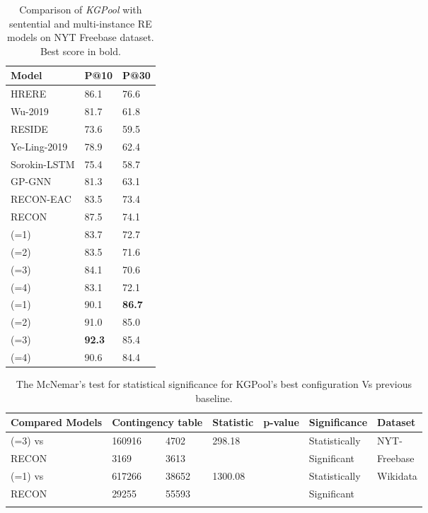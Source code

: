\documentclass[11pt,a4paper]{article}
\newlength\Origarrayrulewidth
\newcommand{\Cline}[1]{\noalign{\global\setlength\Origarrayrulewidth{\arrayrulewidth}}\noalign{\global\setlength\arrayrulewidth{1.1pt}}\cline{#1}\noalign{\global\setlength\arrayrulewidth{\Origarrayrulewidth}}}
\begin{document}
\begin{table}[ht!]
    \centering
\begin{tabular}{p{3.5cm}|p{0.7cm}p{0.7cm}}
\toprule
\textbf{Model} &P@10 & P@30  \\
\midrule
HRERE  & 86.1 & 76.6\\
     Wu-2019  & 81.7 & 61.8\\
     RESIDE & 73.6 &  59.5 \\
   Ye-Ling-2019 & 78.9 & 62.4 \\
    Sorokin-LSTM  & 75.4 & 58.7\\
     GP-GNN   & 81.3 & 63.1\\
        RECON-EAC  &  83.5& 73.4 \\
      RECON & 87.5 &  74.1 \\
\midrule
 (=1) & 83.7 & 72.7  \\
     (=2)  & 83.5 & 71.6 \\
      (=3)& 84.1 & 70.6  \\
       (=4) & 83.1 & 72.1 \\
\midrule
      (=1) & 90.1 &\textbf{86.7}\\
        (=2) & 91.0 & 85.0 \\
          (=3) & \textbf{92.3} & 85.4\\
            (=4) & 90.6 & 84.4 \\
\bottomrule
 \end{tabular}
\caption{Comparison of \textit{KGPool} with sentential and multi-instance RE models on NYT Freebase dataset. Best score in bold.}
\label{tab:results2}
    \vspace{-2mm}
\end{table}
\begin{table*}[!htb]
\small
    \centering
    \begin{tabular}{p{4.2cm}|p{1.0cm}|p{1.0cm}|p{1.2cm}|p{2.6cm}|p{1.5cm}|p{1.5cm}}
        \Cline{1-7}
        \textbf{Compared Models} & \multicolumn{2}{|c|}{\textbf{Contingency table}} & \textbf{Statistic} & \textbf{p-value}  & \textbf{Significance} & \textbf{Dataset} \\
        \hline
 (=3)  vs  &160916 &4702 &298.18  & &Statistically & NYT- \\
RECON &3169 &3613 &  & &Significant& Freebase \\
          \hline
 (=1) vs &617266 &38652 &1300.08  & &Statistically & Wikidata  \\
RECON  &29255 &55593 &  & &Significant & \\
          \hline
\Cline{1-7}
    \end{tabular}
    \caption{The McNemar's test for statistical significance for KGPool's best configuration Vs previous baseline.}
    \label{mcnemars_test}
    \vspace{-3mm}
\end{table*}
\end{document}
